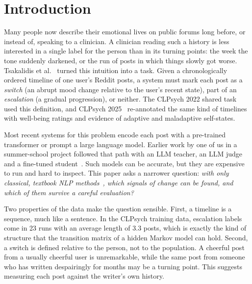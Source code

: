 \documentclass[runningheads]{llncs}
\begin{document}
\section{Introduction}

Many people now describe their emotional lives on public forums long before, or instead of, speaking to a clinician. A clinician reading such a history is less interested in a single label for the person than in its turning points: the week the tone suddenly darkened, or the run of posts in which things slowly got worse. Tsakalidis et al.~\cite{tsakalidis2022identifying} turned this intuition into a task. Given a chronologically ordered timeline of one user's Reddit posts, a system must mark each post as a \emph{switch} (an abrupt mood change relative to the user's recent state), part of an \emph{escalation} (a gradual progression), or neither. The CLPsych 2022 shared task~\cite{tsakalidis2022overview} used this definition, and CLPsych 2025~\cite{tseriotou2025overview} re-annotated the same kind of timelines with well-being ratings and evidence of adaptive and maladaptive self-states.

Most recent systems for this problem encode each post with a pre-trained transformer or prompt a large language model. Earlier work by one of us in a summer-school project followed that path with an LLM teacher, an LLM judge and a fine-tuned student~\cite{kumar2026triage}. Such models can be accurate, but they are expensive to run and hard to inspect. This paper asks a narrower question: \emph{with only classical, textbook NLP methods~\cite{jurafsky2024speech,kurdi2016natural}, which signals of change can be found, and which of them survive a careful evaluation?}

Two properties of the data make the question sensible. First, a timeline is a sequence, much like a sentence. In the CLPsych training data, escalation labels come in 23 runs with an average length of 3.3 posts, which is exactly the kind of structure that the transition matrix of a hidden Markov model can hold. Second, a switch is defined relative to the person, not to the population. A cheerful post from a usually cheerful user is unremarkable, while the same post from someone who has written despairingly for months may be a turning point. This suggests measuring each post against the writer's own history.
\end{document}
